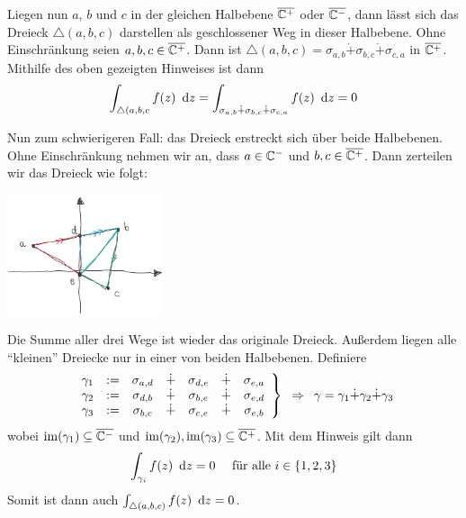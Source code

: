 \begin{exercisePage}
	Liegen nun $a$, $b$ und $c$ in der gleichen Halbebene $\overline{\mathbb{C}^+}$ oder $\overline{\mathbb{C}^-}$, dann lässt sich das Dreieck $\triangle(a,b,c)$ darstellen als geschlossener Weg in dieser Halbebene. Ohne Einschränkung seien $a,b,c \in \overline{\mathbb{C}^+}$. Dann ist $\triangle(a,b,c) = \sigma_{a,b} \dot{+} \sigma_{b,c} \dot{+} \sigma_{c,a}$ in $\overline{\mathbb{C}^+}$. Mithilfe des oben gezeigten Hinweises ist dann 
	\begin{equation*}
		\int_{\triangle(a,b,c} f(z) \enskip \mathrm{d}z = \int_{\sigma_{a,b} \dot{+} \sigma_{b,c} \dot{+} \sigma_{c,a}} f(z) \enskip \mathrm{d}z = 0
	\end{equation*}
	
	Nun zum schwierigeren Fall: das Dreieck erstreckt sich über beide Halbebenen. Ohne Einschränkung nehmen wir an, dass $a \in \mathbb{C}^-$ und $b,c \in \overline{\mathbb{C}^+}$. Dann zerteilen wir das Dreieck wie folgt:
	\begin{center}
		\includegraphics[height=3.5cm]{fkt_uebungen-5-abb.jpg}
	\end{center}
	Die Summe aller drei Wege ist wieder das originale Dreieck. Außerdem liegen alle \enquote{kleinen} Dreiecke nur in einer von beiden Halbebenen.
	Definiere
	\begin{equation*}
		\left.
		\begin{array}{ccccccc}
			\gamma_1 &\mathrel{:=}& \sigma_{a,d} &\dot{+}& \sigma_{d,e} &\dot{+}& \sigma_{e,a} \\
			\gamma_2 &\mathrel{:=}& \sigma_{d,b} &\dot{+}& \sigma_{b,e} &\dot{+}& \sigma_{e,d} \\
			\gamma_3 &\mathrel{:=}& \sigma_{b,c} &\dot{+}& \sigma_{c,e} &\dot{+}& \sigma_{e,b} \\
		\end{array} 
		\right\} \enskip \Rightarrow \enskip
		\gamma = \gamma_1 \dot{+} \gamma_2 \dot{+} \gamma_3
	\end{equation*}
	wobei $\operatorname{im}(\gamma_1) \subseteq \overline{\mathbb{C}^-}$ und $\operatorname{im}(\gamma_2), \operatorname{im}(\gamma_3) \subseteq \overline{\mathbb{C}^+}$. Mit dem Hinweis gilt dann
	\begin{equation*}
		\int_{\gamma_i} f(z) \enskip \mathrm{d}z = 0 \quad \text{ für alle } i \in \left\{ 1,2,3 \right\}
	\end{equation*}
	Somit ist dann auch $\int_{\triangle(a,b,c)} f(z) \enskip \mathrm{d}z = 0$.
		

\end{exercisePage}
